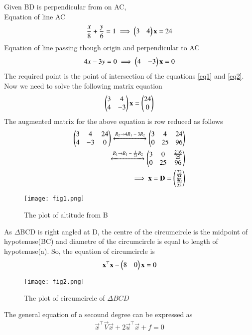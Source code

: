 \documentclass[journal,12pt,twocolumn]{IEEEtran}
\begin{document}
Given BD is perpendicular from  on AC,\\
Equation of line AC 
\begin{align}
\label{eq1}
    \frac{x}{8}+\frac{y}{6}=1 \implies \begin{pmatrix}3 & 4\end{pmatrix}\mathbf{x}=24
\end{align}
Equation of line passing though origin and perpendicular to AC 
\begin{align}
\label{eq2}
    4x-3y=0 \implies \begin{pmatrix}4 & -3\end{pmatrix}\mathbf{x}=0
\end{align}
The required point  is the point of intersection of the equations \ref{eq1} and \ref{eq2}. Now we need to solve the following matrix equation
\begin{align}
    \begin{pmatrix}3&4\\4&-3\end{pmatrix}\mathbf{x} = \begin{pmatrix}24 \\0\end{pmatrix} 
\end{align}
The augmented matrix for the above equation is row reduced as follows
\begin{align}
    \begin{pmatrix}3 & 4 & 24\\4 & -3 & 0\end{pmatrix} \xleftrightarrow{\text{$R_2$}\rightarrow{\text{$4R_1-3R_2$}}} \begin{pmatrix}3&4&24\\0&25&96\end{pmatrix}\\
    \xleftrightarrow{\text{$R_1$}\rightarrow{\text{$R_1-\frac{4}{25}R_2$}}} \begin{pmatrix}3 & 0 & \frac{216}{25}\\ 0 & 25 & 96\end{pmatrix}\\
    \implies \mathbf{x}=\mathbf{D}= \begin{pmatrix}\frac{72}{25}\\\frac{96}{25}\end{pmatrix}
\end{align}
\begin{figure}[H]
   \centering
   \texttt{[image: fig1.png]}
   \caption{The plot of altitude from B }
 \end{figure}
As $\Delta$BCD is right angled at D, the centre of the circumcircle is the midpoint of hypotenuse(BC) and diametre of the circumcircle is equal to length of hypotenuse(a). So,
the equation of circumcircle is
\begin{align}
\label{eq1}
    \mathbf{x}^\top\mathbf{x}-\begin{pmatrix}8&0\end{pmatrix}\mathbf{x} = 0
\end{align}
\begin{figure}[H]
   \centering
   \texttt{[image: fig2.png]}
   \caption{The plot of circumcircle of $\Delta BCD$}
\end{figure}
The general equation of a secound degree can be expressed as 
\begin{align}
\label{eq2}
    \vec{x}^\top\vec{V}\vec{x}+ 2\vec{u}^\top\vec{x}+f=0
\end{align}
\end{document}
